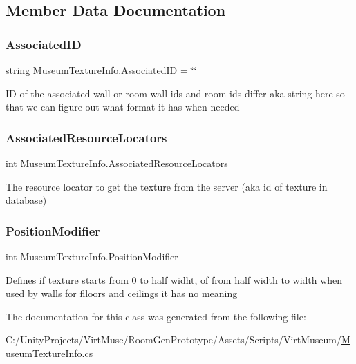 \subsection{Member Data Documentation}
\mbox{\label{class_museum_texture_info_a31425831c498a46842b2cce06e629183}} 
\subsubsection{\texorpdfstring{Associated\+ID}{AssociatedID}}
{\footnotesize\ttfamily string Museum\+Texture\+Info.\+Associated\+ID = \char`\"{}\char`\"{}}



ID of the associated wall or room wall ids and room ids differ aka string here so that we can figure out what format it has when needed 

\mbox{\label{class_museum_texture_info_a5b0c9f041422a931cab7b3de689fe44e}} 
\subsubsection{\texorpdfstring{Associated\+Resource\+Locators}{AssociatedResourceLocators}}
{\footnotesize\ttfamily int Museum\+Texture\+Info.\+Associated\+Resource\+Locators}



The resource locator to get the texture from the server (aka id of texture in database) 

\mbox{\label{class_museum_texture_info_aaa15a48a616e6212ead2dd506f452974}} 
\subsubsection{\texorpdfstring{Position\+Modifier}{PositionModifier}}
{\footnotesize\ttfamily int Museum\+Texture\+Info.\+Position\+Modifier}



Defines if texture starts from 0 to half widht, of from half width to width when used by walls for flloors and ceilings it has no meaning 



The documentation for this class was generated from the following file\+:\begin{DoxyCompactItemize}
\item 
C\+:/\+Unity\+Projects/\+Virt\+Muse/\+Room\+Gen\+Prototype/\+Assets/\+Scripts/\+Virt\+Museum/\mbox{\hyperlink{_museum_texture_info_8cs}{Museum\+Texture\+Info.\+cs}}\end{DoxyCompactItemize}
